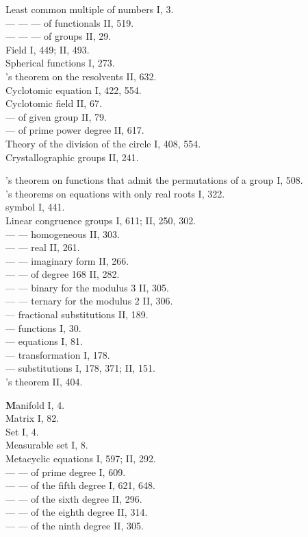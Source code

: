 
\noindent
Least common multiple of numbers I, 3.\\
--- --- --- of functionals II, 519.\\
--- --- --- of groups II, 29.\\
Field I, 449; II, 493.\\
Spherical functions I, 273.\\
's theorem on the resolvents II, 632.\\
Cyclotomic equation I, 422, 554.\\
Cyclotomic field II, 67.\\
--- of given group II, 79.\\
--- of prime power degree II, 617.\\
Theory of the division of the circle I, 408, 554.\\
Crystallographic groups II, 241.

\medskip
\noindent
{}'s theorem on functions that admit the permutations of a group I, 508.\\
's theorems on equations with only real roots I, 322.\\
 symbol I, 441.\\
Linear congruence groups I, 611; II, 250, 302.\\
--- --- homogeneous II, 303.\\
--- --- real II, 261.\\
--- --- imaginary form II, 266.\\
--- --- of degree 168 II, 282.\\
--- --- binary for the modulus 3 II, 305.\\
--- --- ternary for the modulus 2 II, 306.\\
--- fractional substitutions II, 189.\\
--- functions I, 30.\\
--- equations I, 81.\\
--- transformation I, 178.\\
--- substitutions I, 178, 371; II, 151.\\
's theorem II, 404.

\medskip
\noindent
\textbf{M}anifold I, 4.\\
Matrix I, 82.\\
Set I, 4.\\
Measurable set I, 8.\\
Metacyclic equations I, 597; II, 292.\\
--- --- of prime degree I, 609.\\
--- --- of the fifth degree I, 621, 648.\\
--- --- of the sixth degree II, 296.\\
--- --- of the eighth degree II, 314.\\
--- --- of the ninth degree II, 305.

